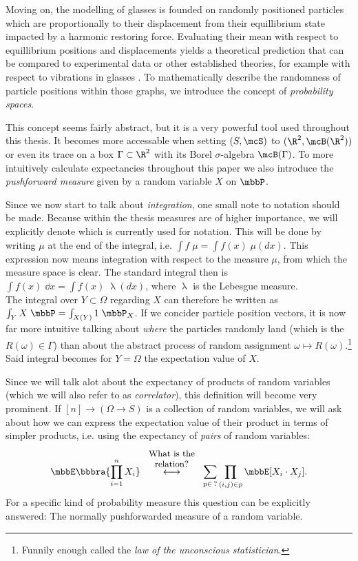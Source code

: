 Moving on, the modelling of glasses is founded on randomly positioned particles which are proportionally to their displacement from their equillibrium state impacted by a harmonic restoring force. Evaluating their mean with respect to equillibrium positions and displacements yields a theoretical prediction that can be compared to experimental data or other established theories, for example with respect to vibrations in glasses \cite{paper:Grigera_2011}. To mathematically describe the randomness of particle positions within those graphs, we introduce the concept of \emph{probability spaces}.

This concept seems fairly abstract, but it is a very powerful tool used throughout this thesis. It becomes more accessable when setting $(S,\mcS)$ to $(\R^2,\mcB(\R^2))$ or even its trace on a box $\Gamma\subset\R^2$ with its Borel $\sigma$-algebra $\mcB(\Gamma)$. To more intuitively calculate expectancies throughout this paper we also introduce the \emph{pushforward measure} given by a random variable $X$ on $\mbbP$.

Since we now start to talk about \emph{integration}, one small note to notation should be made. Because within the thesis measures are of higher importance, we will explicitly denote which is currently used for notation. This will be done by writing $\mu$ at the end of the integral, i.e. $\int f\;\mu = \int f(x)\;\mu(dx)$. This expression now means integration with respect to the measure $\mu$, from which the measure space is clear. The standard integral then is $\int f(x)\;\dd x = \int f(x)\;\uplambda(dx)$, where $\uplambda$ is the Lebesgue measure. \\  
The integral over $Y\subset \Omega$ regarding $X$ can therefore be written as $\int_{Y}X\;\mbbP = \int_{X(Y)}1\;\mbbP_X$. If we concider particle position vectors, it is now far more intuitive talking about \emph{where} the particles randomly land (which is the $R(\omega)\in\Gamma$) than about the abstract process of random assignment $\omega\mapsto R(\omega)$.\footnote{Funnily enough called the \emph{law of the unconscious statistician}.} Said integral becomes for $Y = \Omega$ the expectation value of $X$.

Since we will talk alot about the expectancy of products of random variables (which we will also refer to as \emph{correlator}), this definition will become very prominent. If $[n]\to (\Omega\to S)$ is a collection of random variables, we will ask about how we can express the expectation value of their product in terms of simpler products, i.e. using the expectancy of \emph{pairs} of random variables:
\[
    \mbbE\bbbra{
        \prod_{i=1}^n X_i
    } \stackrel{\substack{
        {
            \small
            \begin{tabular}{c}
                What is the \\
                relation?
            \end{tabular}
        }
    }}{
        \longleftrightarrow
    }
    \sum_{p\in\,?}\prod_{(i,j)\in p}\mbbE[X_i\cdot X_j].
\]
For a specific kind of probability measure this question can be explicitly answered: The normally pushforwarded measure of a random variable.

